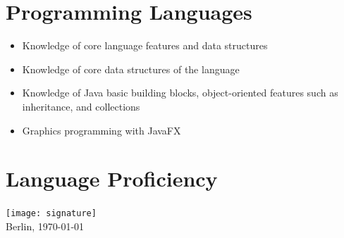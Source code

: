 \documentclass[10pt,a4paper,sans]{moderncv}
\begin{document}
\section{Programming Languages}
 {
  \begin{itemize}
    \item Knowledge of core language features and data structures
  \end{itemize}
}
 {
  \begin{itemize}
      \item Knowledge of core data structures of the language
  \end{itemize}
}
 {
  \begin{itemize}
    \item Knowledge of Java basic building blocks, object-oriented features such as inheritance, and collections
    \item Graphics programming with JavaFX
  \end{itemize}
}

\section{Language Proficiency}

\emptysection{}\closesection
\vfill
\vspace{-0.85cm}
\begin{flushright}
  \texttt{[image: signature]}
  ~\\
  Berlin, \today
\end{flushright}
\end{document}
